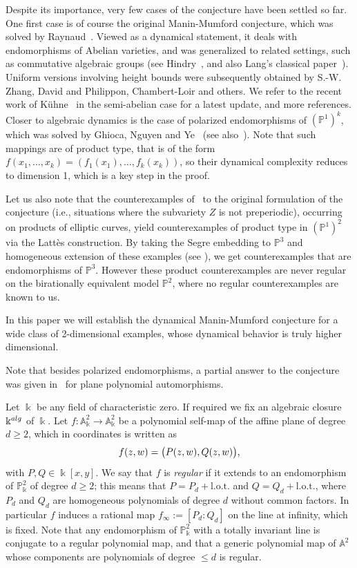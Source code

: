 \documentclass[11 pt, oneside, a4paper]{amsart}
\newcommand{\A}{\mathbb{A}}
\renewcommand{\P}{\mathbb{P}}
\newcommand{\nA}{\mathbb{A}}
\newcommand{\nP}{\mathbb{P}}
\newcommand{\nk}{\Bbbk}
\theoremstyle{definition}
\theoremstyle{definition}
\begin{document}
Despite its importance, very few cases of the conjecture have been settled so far. 
One first case is of course the original Manin-Mumford conjecture, 
which was solved by Raynaud~\cite{raynaud:ManinMumfordcourbes, raynaud:ManinMumfordsousvar}.
Viewed as a dynamical statement, it 
 deals with endomorphisms of Abelian varieties,  
 and was generalized to related  settings, such as commutative algebraic groups (see Hindry~\cite{hindry:1988}, and also Lang's classical paper~\cite{lang:division}). 
 Uniform versions involving height bounds were subsequently obtained by  
 S.-W. Zhang, David and Philippon, Chambert-Loir and others. We refer to the recent work of Kühne~\cite{MR4404794} in the semi-abelian case for a latest update, 
and more references.  
Closer to algebraic dynamics is the case 
 of polarized endomorphisms of $(\P^1)^k$, which was solved by Ghioca, Nguyen and Ye~\cite{GNY1, GNY2} (see also~\cite{GT21}). Note that such mappings are of product type, 
that is  of the form $f(x_1, \ldots , x_k) = (f_1(x_1), \ldots , f_k(x_k))$, 
so their dynamical complexity reduces to dimension 1, which is a key step in the proof.  

{Let us also note that 
the counterexamples of~\cite{GTZ11} to the original formulation of the conjecture (i.e., situations where the subvariety $Z$ is not preperiodic), occurring on products of elliptic curves, yield counterexamples of product type  in $(\P^1)^2$ via the Lattès construction.
By taking the Segre embedding to $\P^3$ and homogeneous extension of these examples (see \cite{fakhruddin:questselfmapalgvar,bhatnagar-szpiro:vamppolarextprojspace}), we get counterexamples that are endomorphisms of $\nP^3$.
However these product counterexamples are never regular on the birationally equivalent model $\nP^2$, where no regular counterexamples are known to us.
}

In this paper we will establish the dynamical 
Manin-Mumford conjecture for a wide class of 2-dimensional examples, 
whose dynamical behavior is  truly higher dimensional. 

Note that besides polarized endomorphisms, a partial answer to the conjecture 
was given in~\cite{DMM-henon} for plane polynomial automorphisms. 

\medskip

Let $\nk$ be any field of characteristic zero. 
If required we fix an algebraic closure $\nk^{\rm alg}$ of $\nk$. 
Let $f\colon\nA_\nk^2 \to \nA_\nk^2$ be a polynomial self-map 
of the affine plane of degree $d \geq 2$, 
which in coordinates is written as
\[
f(z,w)=\big(P(z,w),Q(z,w)\big)\text,
\]
with $P,Q \in \nk[x,y]$.
We say that $f$ is \emph{regular} if 
 it extends to an endomorphism of $\nP_\nk^2$ of degree $d\ge2$; this means that 
 $P=P_d + \text{l.o.t.}$ and $Q=Q_d + \text{l.o.t.}$, where $P_d$ and $Q_d$ are homogeneous polynomials of degree $d$ without common factors. 
 In particular $f$ induces a rational map $f_\infty := [P_d: Q_d]$ on the line at infinity, which is fixed. Note that 
 any endomorphism of $\nP_\nk^2$ with a totally invariant line is conjugate to a 
 regular polynomial map, and that a generic polynomial map of $\A^2$ whose components are polynomials of degree $\le d$ is regular. 
 
\end{document}
